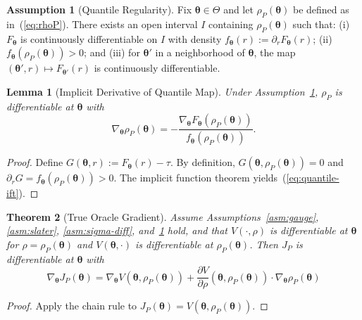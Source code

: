 \documentclass[lettersize,journal]{IEEEtran}
\newcommand{\btheta}{\bm{\theta}}
\newtheorem{theorem}{Theorem}
\newtheorem{lemma}[theorem]{Lemma}
\theoremstyle{definition}
\newtheorem{assumption}{Assumption}
\begin{document}
\begin{assumption}[Quantile Regularity]\label{asm:quantile-reg}
Fix $\btheta \in \Theta$ and let $\rho_P(\btheta)$ be defined as in~(\ref{eq:rhoP}). There exists an open interval $I$ containing $\rho_P(\btheta)$ such that: (i) $F_{\btheta}$ is continuously differentiable on $I$ with density $f_{\btheta}(r) := \partial_r F_{\btheta}(r)$; (ii) $f_{\btheta}(\rho_P(\btheta)) > 0$; and (iii) for $\btheta'$ in a neighborhood of $\btheta$, the map $(\btheta',r) \mapsto F_{\btheta'}(r)$ is continuously differentiable.
\end{assumption}

\begin{lemma}[Implicit Derivative of Quantile Map]\label{lem:quantile-deriv}
Under Assumption~\ref{asm:quantile-reg}, $\rho_P$ is differentiable at $\btheta$ with
\begin{equation}\label{eq:quantile-ift}
\nabla_{\btheta} \rho_P(\btheta) = -\frac{\nabla_{\btheta} F_{\btheta}(\rho_P(\btheta))}{f_{\btheta}(\rho_P(\btheta))}.
\end{equation}
\end{lemma}

\begin{proof}
Define $G(\btheta,r) := F_{\btheta}(r) - \tau$. By definition, $G(\btheta, \rho_P(\btheta)) = 0$ and $\partial_r G = f_{\btheta}(\rho_P(\btheta)) > 0$. The implicit function theorem yields~(\ref{eq:quantile-ift}).
\end{proof}

\begin{theorem}[True Oracle Gradient]\label{thm:true-oracle-grad}
Assume Assumptions~\ref{asm:gauge}, \ref{asm:slater}, \ref{asm:sigma-diff}, and~\ref{asm:quantile-reg} hold, and that $V(\cdot,\rho)$ is differentiable at $\btheta$ for $\rho = \rho_P(\btheta)$ and $V(\btheta,\cdot)$ is differentiable at $\rho_P(\btheta)$. Then $J_P$ is differentiable at $\btheta$ with
\begin{equation}\label{eq:true-grad}
\boxed{
\nabla_{\btheta} J_P(\btheta) = \nabla_{\btheta} V(\btheta, \rho_P(\btheta)) + \frac{\partial V}{\partial\rho}(\btheta, \rho_P(\btheta)) \cdot \nabla_{\btheta} \rho_P(\btheta)
}
\end{equation}
\end{theorem}

\begin{proof}
Apply the chain rule to $J_P(\btheta) = V(\btheta, \rho_P(\btheta))$.
\end{proof}
\end{document}
